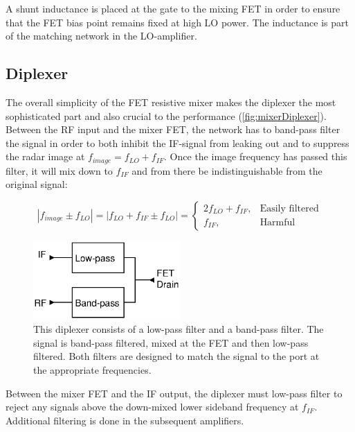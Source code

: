 			 A shunt inductance is placed at the gate to the mixing FET in order to ensure that the FET bias point remains fixed at high LO power. The inductance is part of the matching network in the LO-amplifier.

		\subsection{Diplexer}
			The overall simplicity of the FET resistive mixer makes the diplexer the most sophisticated part and also crucial to the performance (\autoref{fig:mixerDiplexer}). Between the RF input and the mixer FET, the network has to band-pass filter the signal in order to both inhibit the IF-signal from leaking out and to suppress the radar image at $f_{image}=f_{LO}+f_{IF}$. Once the image frequency has passed this filter, it will mix down to $f_{IF}$ and from there be indistinguishable from the original signal:

			\begin{equation}
				|f_{image}\pm f_{LO}| = |f_{LO}+f_{IF}\pm f_{LO}| = \left \{
				\begin{array}{ll}
					2f_{LO}+f_{IF}, & \text{Easily filtered} \\
					f_{IF},	& \text{Harmful}
				\end{array}
				\right.
			\end{equation}

			\begin{figure}[hbt!]
				\centering
				\includegraphics[width=0.5\textwidth]{fig/mixer/diplexer}
				\caption[Mixer diplexer signal path]{This diplexer consists of a low-pass filter and a band-pass filter. The signal is band-pass filtered, mixed at the FET and then low-pass filtered. Both filters are designed to match the signal to the port at the appropriate frequencies.}\label{fig:mixerDiplexer}
			\end{figure}

			Between the mixer FET and the IF output, the diplexer must low-pass filter to reject any signals above the down-mixed lower sideband frequency at $f_{IF}$. Additional filtering is done in the subsequent amplifiers.

